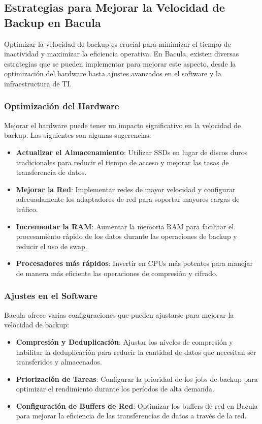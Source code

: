 \subsection{Estrategias para Mejorar la Velocidad de Backup en Bacula}

Optimizar la velocidad de backup es crucial para minimizar el tiempo de inactividad y maximizar la eficiencia operativa. En Bacula, existen diversas estrategias que se pueden implementar para mejorar este aspecto, desde la optimización del hardware hasta ajustes avanzados en el software y la infraestructura de TI.

\subsubsection{Optimización del Hardware}

Mejorar el hardware puede tener un impacto significativo en la velocidad de backup. Las siguientes son algunas sugerencias:

\begin{itemize}
    \item \textbf{Actualizar el Almacenamiento}: Utilizar SSDs en lugar de discos duros tradicionales para reducir el tiempo de acceso y mejorar las tasas de transferencia de datos.
    \item \textbf{Mejorar la Red}: Implementar redes de mayor velocidad y configurar adecuadamente los adaptadores de red para soportar mayores cargas de tráfico.
    \item \textbf{Incrementar la RAM}: Aumentar la memoria RAM para facilitar el procesamiento rápido de los datos durante las operaciones de backup y reducir el uso de swap.
    \item \textbf{Procesadores más rápidos}: Invertir en CPUs más potentes para manejar de manera más eficiente las operaciones de compresión y cifrado.
\end{itemize}

\subsubsection{Ajustes en el Software}

Bacula ofrece varias configuraciones que pueden ajustarse para mejorar la velocidad de backup:

\begin{itemize}
    \item \textbf{Compresión y Deduplicación}: Ajustar los niveles de compresión y habilitar la deduplicación para reducir la cantidad de datos que necesitan ser transferidos y almacenados.
    \item \textbf{Priorización de Tareas}: Configurar la prioridad de los jobs de backup para optimizar el rendimiento durante los períodos de alta demanda.
    \item \textbf{Configuración de Buffers de Red}: Optimizar los buffers de red en Bacula para mejorar la eficiencia de las transferencias de datos a través de la red.
\end{itemize}

